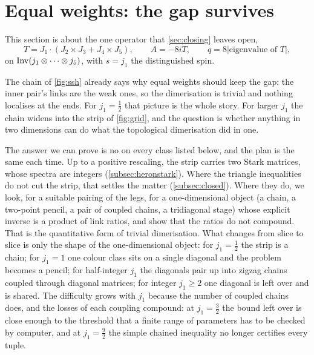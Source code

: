 \section{Equal weights: the gap survives}\label{sec:tone}

This section is about the one operator that \cref{sec:closing} leaves open,
\[
  T=J_1\cdot(J_2\times J_3+J_4\times J_5),\qquad A=-8iT,\qquad q=8|\text{eigenvalue of }T|,
\]
on $\operatorname{Inv}(j_1\otimes\cdots\otimes j_5)$, with $s=j_1$ the distinguished spin.

The chain of \cref{fig:ssh} already says why equal weights should keep the gap: the
inner pair's links are the weak ones, so the dimerisation is trivial and nothing
localises at the ends. For $j_1=\frac12$ that picture is the whole story. For larger
$j_1$ the chain widens into the strip of \cref{fig:grid}, and the question is whether
anything in two dimensions can do what the topological dimerisation did in one.

The answer we can prove is no on every class listed below, and the plan is the same
each time. Up to a positive rescaling, the strip carries two Stark matrices, whose
spectra are integers (\cref{subsec:heronstark}). Where the triangle inequalities do not
cut the strip, that settles the matter (\cref{subsec:closed}). Where they do, we look,
for a suitable pairing of the legs, for a one-dimensional object (a chain, a
two-point pencil, a pair of coupled chains, a tridiagonal stage) whose explicit inverse
is a product of link ratios, and show that the ratios do not compound. That is the
quantitative form of trivial dimerisation. What changes from slice to slice is only
the shape of the one-dimensional object: for $j_1=\frac12$ the strip is a chain; for
$j_1=1$ one colour class sits on a single diagonal and the problem becomes a pencil;
for half-integer $j_1$ the diagonals pair up into zigzag chains coupled through
diagonal matrices; for integer $j_1\ge2$ one diagonal is left over and is shared. The
difficulty grows with $j_1$ because the number of coupled chains does, and the losses
of each coupling compound: at $j_1=\frac32$ the bound left over is close enough to
the threshold that a finite range of parameters has to be checked by computer, and at
$j_1=\frac92$ the simple chained inequality no longer certifies every tuple.

